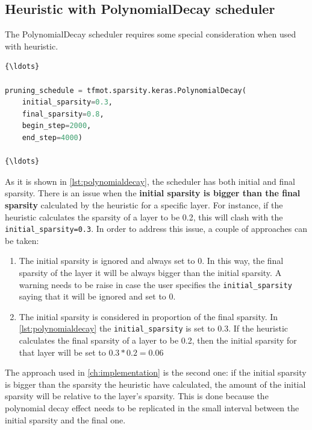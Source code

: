 \subsection{Heuristic with PolynomialDecay scheduler}
The PolynomialDecay scheduler requires some special consideration when used
with heuristic.

\begin{lstlisting}[language=Python, label={lst:polynomialdecay},
    caption=PolynomialDecay Scheduler in TFMOT]
{\ldots}

pruning_schedule = tfmot.sparsity.keras.PolynomialDecay(
    initial_sparsity=0.3,
    final_sparsity=0.8,
    begin_step=2000,
    end_step=4000)

{\ldots}
\end{lstlisting}

As it is shown in \autoref{lst:polynomialdecay}, the scheduler has both initial
and final sparsity.
There is an issue when the \textbf{initial sparsity is bigger than the final
sparsity} calculated by the heuristic for a specific layer.
For instance, if the heuristic calculates the sparsity of a layer to be 0.2,
this will clash with the \texttt{initial\_sparsity=0.3}.
In order to address this issue, a couple of approaches can be taken:

\begin{enumerate}
    \item The initial sparsity is ignored and always set to 0. In this way, the
        final sparsity of the layer it will be always bigger than the initial
        sparsity. A warning needs to be raise in case the user specifies the
        \texttt{initial\_sparsity} saying that it will be ignored and set to 0.
    \item The initial sparsity is considered in proportion of the final
        sparsity. In \autoref{lst:polynomialdecay} the
        \texttt{initial\_sparsity} is set to 0.3. If the heuristic calculates
        the final sparsity of a layer to be 0.2, then the initial sparsity for
        that layer will be set to $0.3 * 0.2 = 0.06$
\end{enumerate}

The approach used in \autoref{ch:implementation} is the second one: if the
initial sparsity is bigger than the sparsity the heuristic have calculated, the
amount of the initial sparsity will be relative to the layer's sparsity.
This is done because the polynomial decay effect needs to be replicated in the
small interval between the initial sparsity and the final one.
